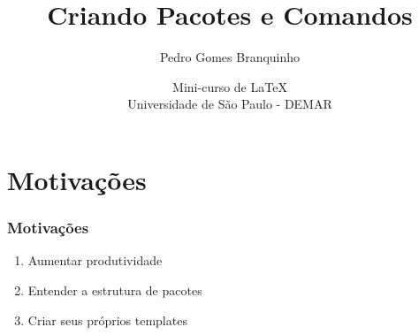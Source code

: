 \documentclass{beamer}
\title[Relatórios]{\Huge{Criando Pacotes e Comandos}}
\author[Branquinho]{Pedro Gomes Branquinho \\
  \text{\scriptsize{pedro.branquinho@usp.br}}}
\date[ABNTeX]{\scriptsize{Mini-curso de \LaTeX \\ Universidade de São Paulo - DEMAR}}
\begin{document}
{
  \begin{frame}
    \titlepage
  \end{frame}
}

\usenavigationsymbolstemplate{}





\section{Motivações}
\begin{frame}
  \frametitle{Motivações}

  \begin{enumerate}
  \item Aumentar produtividade
  \item Entender a estrutura de pacotes
  \item Criar seus próprios templates
  \end{enumerate}

\end{frame}
\end{document}
